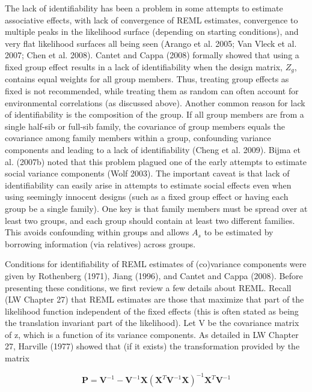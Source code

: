 \documentclass{article}
\begin{document}
The lack of identifiability has been a problem in some attempts to estimate associative effects, with lack of convergence of REML estimates, convergence to multiple peaks in the likelihood surface (depending on starting conditions), and very flat likelihood surfaces all being seen (Arango et al. 2005; Van Vleck et al. 2007; Chen et al. 2008). Cantet and Cappa (2008) formally showed that using a fixed group effect results in a lack of identifiability when the design matrix,  $ Z_{g} $, contains equal weights for all group members. Thus, treating group effects as fixed is not recommended, while treating them as random can often account for environmental correlations (as discussed above). Another common reason for lack of identifiability is the composition of the group. If all group members are from a single half-sib or full-sib family, the covariance of group members equals the covariance among family members within a group, confounding variance components and leading to a lack of identifiability (Cheng et al. 2009). Bijma et al. (2007b) noted that this problem plagued one of the early attempts to estimate social variance components (Wolf 2003). The important caveat is that lack of identifiability can easily arise in attempts to estimate social effects even when using seemingly innocent designs (such as a fixed group effect or having each group be a single family). One key is that family members must be spread over at least two groups, and each group should contain at least two different families. This avoids confounding within groups and allows  $ A_{s} $ to be estimated by borrowing information (via relatives) across groups.

Conditions for identifiability of REML estimates of (co)variance components were given by Rothenberg (1971), Jiang (1996), and Cantet and Cappa (2008). Before presenting these conditions, we first review a few details about REML. Recall (LW Chapter 27) that REML estimates are those that maximize that part of the likelihood function independent of the fixed effects (this is often stated as being the translation invariant part of the likelihood). Let V be the covariance matrix of z, which is a function of its variance components. As detailed in LW Chapter 27, Harville (1977) showed that (if it exists) the transformation provided by the matrix

\begin{equation}
\mathbf{P}=\mathbf{V}^{-1}-\mathbf{V}^{-1}\mathbf{X}(\mathbf{X}^{T}\mathbf{V}^{-1}\mathbf{X})^{-1}\mathbf{X}^{T}\mathbf{V}^{-1}
\tag{22.44a}
\label{eq:22_44a}
\end{equation}
\end{document}
